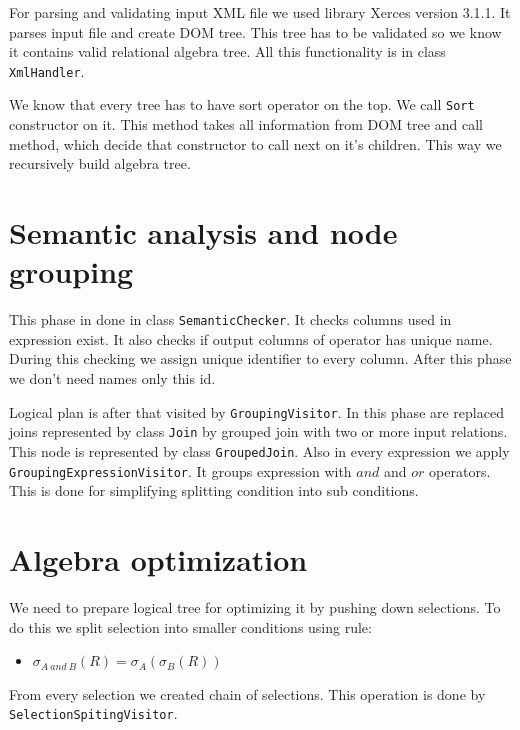 For parsing and validating input XML file we used library Xerces version 3.1.1\cite{xerces}. It parses input file and create DOM tree. This tree has to be validated so we know it contains valid relational algebra tree. All this functionality is in class \texttt{XmlHandler}.

We know that every tree has to have sort operator on the top. We call \texttt{Sort} constructor on it. This method takes all information from DOM tree and call method, which decide that constructor to call next on it's children. This way we recursively build algebra tree.



\section{Semantic analysis and node grouping}

This phase in done in class \texttt{SemanticChecker}. It checks columns used in expression exist. It also checks if output columns of operator has unique name. During this checking we assign unique identifier to every column. After this phase we don't need names only this id.

Logical plan is after that visited by \texttt{GroupingVisitor}. In this phase are replaced joins represented by class \texttt{Join} by grouped join with two or more input relations. This node is represented by class \texttt{GroupedJoin}. Also in every expression we apply \texttt{GroupingExpressionVisitor}. It groups expression with $and$ and $or$ operators. This is done for simplifying splitting condition into sub conditions.

\section{Algebra optimization}

We need to prepare logical tree for optimizing it by pushing down selections. To do this we split selection into smaller conditions using rule:
\begin{itemize}
\item $\sigma_{A~and~B}(R)=\sigma_{A}(\sigma_{B}(R))$
\end{itemize}
From every selection we created chain of selections. This operation is done by \texttt{SelectionSpitingVisitor}.

